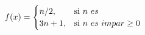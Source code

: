 \documentclass[preview]{standalone}
\begin{document}
\begin{align*}
f(x) = \begin{cases} n/2, & \text{si } n \ es\par \\ 3n+1, & \text{si } n \ es \ impar \geq 0 \end{cases}
\end{align*}
\end{document}
